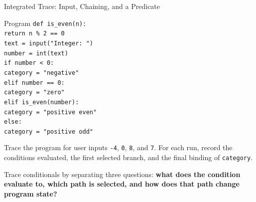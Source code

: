 \documentclass[aspectratio=169,10pt]{beamer}
\begin{document}
\begin{frame}[shrink=4]{Integrated Trace: Input, Chaining, and a Predicate}
  \begin{block}{Program}
    \texttt{def is\_even(n):}\\
    \hspace*{0.20in}\texttt{return n \% 2 == 0}\\[0.06in]
    \texttt{text = input("Integer: ")}\\
    \texttt{number = int(text)}\\
    \texttt{if number < 0:}\\
    \hspace*{0.20in}\texttt{category = "negative"}\\
    \texttt{elif number == 0:}\\
    \hspace*{0.20in}\texttt{category = "zero"}\\
    \texttt{elif is\_even(number):}\\
    \hspace*{0.20in}\texttt{category = "positive even"}\\
    \texttt{else:}\\
    \hspace*{0.20in}\texttt{category = "positive odd"}
  \end{block}

  \begin{activity}
    Trace the program for user inputs \texttt{-4}, \texttt{0}, \texttt{8}, and \texttt{7}. For each run, record the conditions evaluated, the first selected branch, and the final binding of \texttt{category}.
  \end{activity}

  \begin{keyidea}
    Trace conditionals by separating three questions: \textbf{what does the condition evaluate to, which path is selected, and how does that path change program state?}
  \end{keyidea}
\end{frame}
\end{document}
